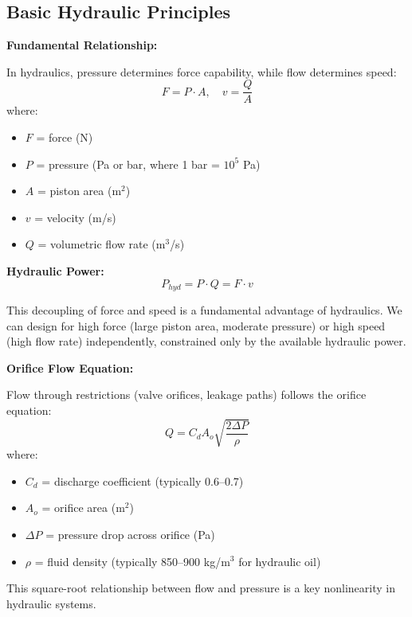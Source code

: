 \subsection{Basic Hydraulic Principles}

\textbf{Fundamental Relationship:}

In hydraulics, pressure determines force capability, while flow determines speed:
\begin{equation}
    F = P \cdot A, \quad v = \frac{Q}{A}
\end{equation}
where:
\begin{itemize}
    \item $F$ = force (N)
    \item $P$ = pressure (Pa or bar, where 1 bar = $10^5$ Pa)
    \item $A$ = piston area (m$^2$)
    \item $v$ = velocity (m/s)
    \item $Q$ = volumetric flow rate (m$^3$/s)
\end{itemize}

\textbf{Hydraulic Power:}
\begin{equation}
    P_{hyd} = P \cdot Q = F \cdot v
\end{equation}

This decoupling of force and speed is a fundamental advantage of hydraulics. We can design for high force (large piston area, moderate pressure) or high speed (high flow rate) independently, constrained only by the available hydraulic power.

\textbf{Orifice Flow Equation:}

Flow through restrictions (valve orifices, leakage paths) follows the orifice equation:
\begin{equation}
    \boxed{Q = C_d A_o \sqrt{\frac{2 \Delta P}{\rho}}}
    \label{eq:orifice_flow}
\end{equation}
where:
\begin{itemize}
    \item $C_d$ = discharge coefficient (typically 0.6--0.7)
    \item $A_o$ = orifice area (m$^2$)
    \item $\Delta P$ = pressure drop across orifice (Pa)
    \item $\rho$ = fluid density (typically 850--900 kg/m$^3$ for hydraulic oil)
\end{itemize}

This square-root relationship between flow and pressure is a key nonlinearity in hydraulic systems.

